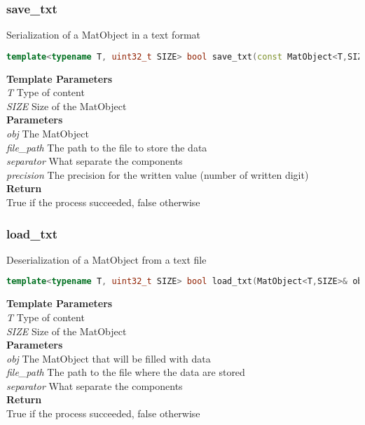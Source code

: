 \subsubsection{save\_txt}
\begin{mdframed}
Serialization of a MatObject in a text format 
\begin{lstlisting}[language=C++]
template<typename T, uint32_t SIZE> bool save_txt(const MatObject<T,SIZE>& obj, std::string file_path, char separator = ' ', uint32_t precision = 6) 
\end{lstlisting}
\textbf{Template Parameters} \\ 
\textit{T} Type of content \\ 
\textit{SIZE} Size of the MatObject \\ 
\textbf{Parameters} \\ 
\textit{obj} The MatObject \\ 
\textit{file\_path} The path to the file to store the data \\ 
\textit{separator} What separate the components \\ 
\textit{precision} The precision for the written value (number of written digit) \\ 
\textbf{Return} \\ 
True if the process succeeded, false otherwise\\ 
\end{mdframed}

\subsubsection{load\_txt}
\begin{mdframed}
Deserialization of a MatObject from a text file
\begin{lstlisting}[language=C++]
template<typename T, uint32_t SIZE> bool load_txt(MatObject<T,SIZE>& obj, std::string file_path, char separator = ' ') 
\end{lstlisting}
\textbf{Template Parameters} \\ 
\textit{T} Type of content \\ 
\textit{SIZE} Size of the MatObject \\ 
\textbf{Parameters} \\ 
\textit{obj} The MatObject that will be filled with data \\ 
\textit{file\_path} The path to the file where the data are stored \\ 
\textit{separator} What separate the components \\ 
\textbf{Return} \\ 
True if the process succeeded, false otherwise\\ 
\end{mdframed}

